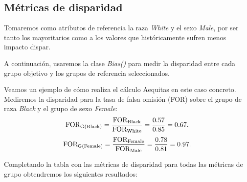 \subsection*{Métricas de disparidad}

Tomaremos como atributos de referencia la raza \textit{White} y el sexo \textit{Male}, por ser tanto los mayoritarios como a los valores que históricamente sufren menos impacto dispar.

A continuación, usaremos la clase \textit{Bias()} para medir la disparidad entre cada grupo objetivo y los grupos de referencia seleccionados. 

Veamos un ejemplo de cómo realiza el cálculo Aequitas en este caso concreto. Mediremos la disparidad para la tasa de falsa omisión (FOR) sobre el grupo de raza \textit{Black} y el grupo de sexo \textit{Female}:
$$\text{FOR}_{\text{G(Black)}}=\frac{\displaystyle \text{FOR}_{\text{Black}}}{\displaystyle \text{FOR}_{\text{White}}}=\frac{\displaystyle 0.57}{\displaystyle 0.85}=0.67.$$
$$\text{FOR}_{\text{G(Female)}}=\frac{\displaystyle \text{FOR}_{\text{Female}}}{\displaystyle \text{FOR}_{\text{Male}}}=\frac{\displaystyle 0.78}{\displaystyle 0.81}=0.97.$$

Completando la tabla con las métricas de disparidad para todas las métricas de grupo obtendremos los siguientes resultados:

